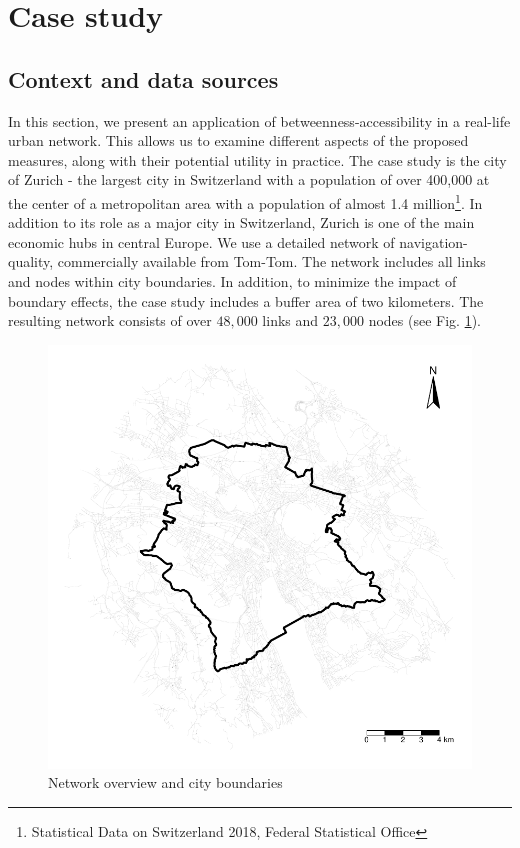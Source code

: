 \documentclass[]{elsarticle} %
\begin{document}
\hypertarget{case-study}{%
\section{Case study}\label{case-study}}

\hypertarget{context-and-data-sources}{%
\subsection{Context and data sources}\label{context-and-data-sources}}

In this section, we present an application of betweenness-accessibility
in a real-life urban network. This allows us to examine different
aspects of the proposed measures, along with their potential utility in
practice. The case study is the city of Zurich - the largest city in
Switzerland with a population of over 400,000 at the center of a
metropolitan area with a population of almost 1.4 million\footnote{Statistical
  Data on Switzerland 2018, Federal Statistical Office}. In addition to
its role as a major city in Switzerland, Zurich is one of the main
economic hubs in central Europe. We use a detailed network of
navigation-quality, commercially available from Tom-Tom. The network
includes all links and nodes within city boundaries. In addition, to
minimize the impact of boundary effects, the case study includes a
buffer area of two kilometers. The resulting network consists of over
\(48,000\) links and \(23,000\) nodes (see Fig. \ref{network}).

\begin{figure}
  \centering
  \includegraphics[width=0.6\linewidth]{Plots/network_overview.pdf}  
  \caption{Network overview and city boundaries}
  \label{network}
\end{figure}
\end{document}
